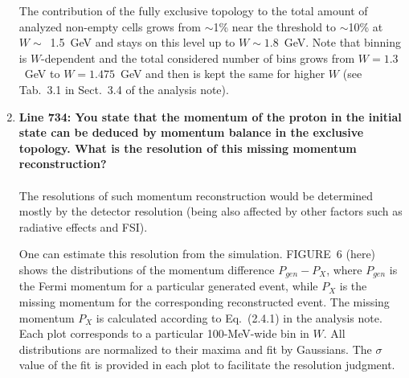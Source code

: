 \documentclass[,superscriptaddress,showpacs,amssymb,amsmath,amsfonts,linenumbers,article]{revtex4-1}
\begin{document}
\begin{enumerate}[label=\textbf{\arabic*}.]
The contribution of the fully exclusive topology to the total amount of analyzed non-empty cells grows from $\sim$1\% near the threshold to $\sim$10\% at $W\sim$~1.5~GeV and stays on this level up to $W\sim1.8$~GeV. Note that binning is $W$-dependent and the total considered number of bins grows from $W = 1.3$~GeV to $W = 1.475$~GeV and then is kept the same for higher $W$ (see Tab.~3.1 in Sect.~3.4 of the analysis note).

\item {\bf Line 734: You state that the momentum of the proton in the initial state can be deduced by momentum balance in the exclusive topology. What is the resolution of this missing momentum reconstruction?} \\ \\
The resolutions of such momentum reconstruction would be determined mostly by the detector resolution (being also affected by other factors such as radiative effects and FSI).

One can estimate this resolution from the simulation. FIGURE~6 (here) shows the distributions of the momentum difference $P_{gen} - P_{X}$, where $P_{gen}$ is the Fermi momentum for a particular generated event, while $P_{X}$ is the missing momentum for the corresponding reconstructed event. The missing momentum $P_{X}$ is calculated according to Eq.~(2.4.1) in the analysis note. Each plot corresponds to a particular 100-MeV-wide bin in $W$.  All distributions are normalized to their maxima and fit by Gaussians. The $\sigma$ value of the fit is provided in each plot to facilitate the resolution judgment.


\end{enumerate}
\end{document}
